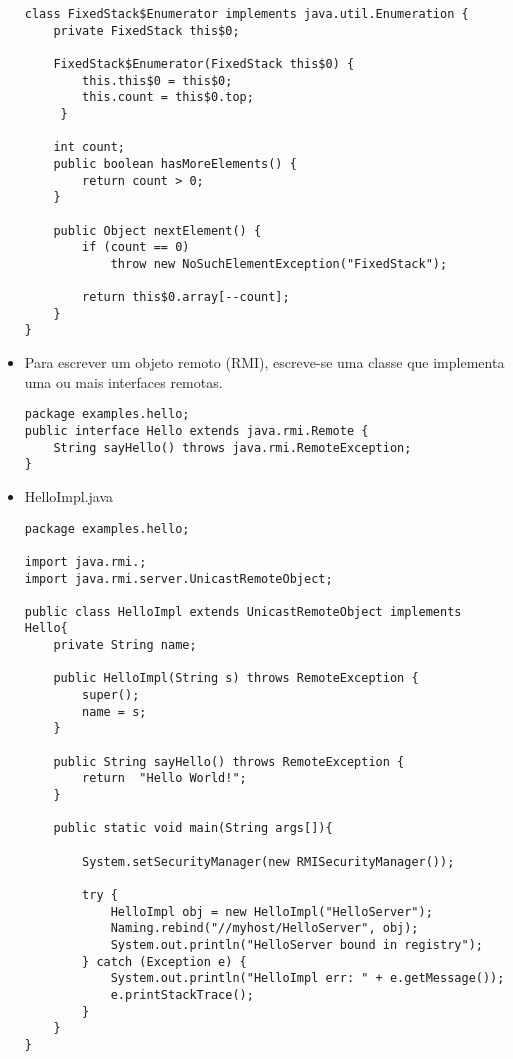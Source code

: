 \begin{itemize}
\begin{lstlisting}
class FixedStack$Enumerator implements java.util.Enumeration {
	private FixedStack this$0;
	
	FixedStack$Enumerator(FixedStack this$0) {
		this.this$0 = this$0;
		this.count = this$0.top;
	 }
			
	int count;
	public boolean hasMoreElements() {
		return count > 0;
	}
		
	public Object nextElement() {
		if (count == 0)
			throw new NoSuchElementException("FixedStack");
		
		return this$0.array[--count];
	}
}
\end{lstlisting}
			
			\clearpage
			\item Para escrever um objeto remoto (RMI), escreve-se uma classe que implementa uma ou mais interfaces remotas. 
			
\begin{lstlisting}
package examples.hello;
public interface Hello extends java.rmi.Remote {
	String sayHello() throws java.rmi.RemoteException;
}
\end{lstlisting}
	 
\item HelloImpl.java
\begin{lstlisting}
package examples.hello;

import java.rmi.;
import java.rmi.server.UnicastRemoteObject;

public class HelloImpl extends UnicastRemoteObject implements Hello{
	private String name;
	
	public HelloImpl(String s) throws RemoteException {
		super();
		name = s;
	}
	
	public String sayHello() throws RemoteException {
		return  "Hello World!";
	}
	
	public static void main(String args[]){
	
		System.setSecurityManager(new RMISecurityManager());
	
		try {
			HelloImpl obj = new HelloImpl("HelloServer");
			Naming.rebind("//myhost/HelloServer", obj);
			System.out.println("HelloServer bound in registry");
		} catch (Exception e) {
			System.out.println("HelloImpl err: " + e.getMessage());
			e.printStackTrace();
		}
	}
}
\end{lstlisting}
		\end{itemize}


	\clearpage
